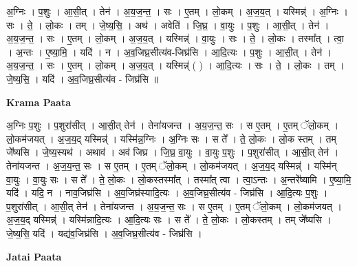 \documentclass[17pt]{extarticle}
\begin{document}
अ॒ग्निः । प॒शुः । आ॒सी॒त् । तेन॑ । अ॒य॒ज॒न्त॒ । सः । ए॒तम् । लो॒कम् । अ॒ज॒य॒त् । यस्मिन्न्॑ । अ॒ग्निः । सः । ते॒ । लो॒कः । तम् । जे॒ष्य॒सि॒ । अथ॑ । अवेति॑ । जि॒घ्र॒ । वा॒युः । प॒शुः । आ॒सी॒त् । तेन॑ । अ॒य॒ज॒न्त॒ । सः । ए॒तम् । लो॒कम् । अ॒ज॒य॒त् । यस्मिन्न्॑ । वा॒युः । सः । ते॒ । लो॒कः । तस्मा᳚त् । त्वा॒ । अ॒न्तः । ए॒ष्या॒मि॒ । यदि॑ । न । अ॒व॒जिघ्र॒सीत्य॑व-जिघ्र॑सि । आ॒दि॒त्यः । प॒शुः । आ॒सी॒त् । तेन॑ । अ॒य॒ज॒न्त॒ । सः । ए॒तम् । लो॒कम् । अ॒ज॒य॒त् । यस्मिन्न्॑ ( ) । आ॒दि॒त्यः । सः । ते॒ । लो॒कः । तम् । जे॒ष्य॒सि॒ । यदि॑ । अ॒व॒जिघ्र॒सीत्य॑व - जिघ्र॑सि ॥  \newline


\textbf{Krama Paata} \newline

अ॒ग्निः प॒शुः । प॒शुरा॑सीत् । आ॒सी॒त् तेन॑ । तेना॑यजन्त । अ॒य॒ज॒न्त॒ सः । स ए॒तम् । ए॒तम् ॅलो॒कम् । लो॒कम॑जयत् । अ॒ज॒य॒द् यस्मिन्न्॑ । यस्मि॑न्न॒ग्निः । अ॒ग्निः सः । स ते᳚ । ते॒ लो॒कः । लो॒क स्तम् । तम् जे᳚ष्यसि । जे॒ष्य॒स्यथ॑ । अथाव॑ । अव॑ जिघ्र । जि॒घ्र॒ वा॒युः । वा॒युः प॒शुः । प॒शुरा॑सीत् । आ॒सी॒त् तेन॑ । तेना॑यजन्त । अ॒ज॒य॒न्त॒ सः । स ए॒तम् । ए॒तम् ॅलो॒कम् । लो॒कम॑जयत् । अ॒ज॒य॒द् यस्मिन्न्॑ । यस्मि॑न् वा॒युः । वा॒युः सः । स ते᳚ । ते॒ लो॒कः । लो॒कस्तस्मा᳚त् । तस्मा᳚त् त्वा । त्वा॒ऽन्तः । अ॒न्तरे᳚ष्यामि । ए॒ष्या॒मि॒ यदि॑ । यदि॒ न । नाव॒जिघ्र॑सि । अ॒व॒जिघ्र॑स्यादि॒त्यः । अ॒व॒जिघ्र॒सीत्य॑व - जिघ्र॑सि । आ॒दि॒त्यः प॒शुः । प॒शुरा॑सीत् । आ॒सी॒त् तेन॑ । तेना॑यजन्त । अ॒य॒ज॒न्त॒ सः । स ए॒तम् । ए॒तम् ॅलो॒कम् । लो॒कम॑जयत् । अ॒ज॒य॒द् यस्मिन्न्॑ । यस्मि॑न्नादि॒त्यः । आ॒दि॒त्यः सः । स ते᳚ । ते॒ लो॒कः । लो॒कस्तम् । तम् जे᳚ष्यसि । जे॒ष्य॒सि॒ यदि॑ । यद्य॑व॒जिघ्र॑सि । अ॒व॒जिघ्र॒सीत्य॑व - जिघ्र॑सि । \newline

\textbf{Jatai Paata} \newline
\end{document}
